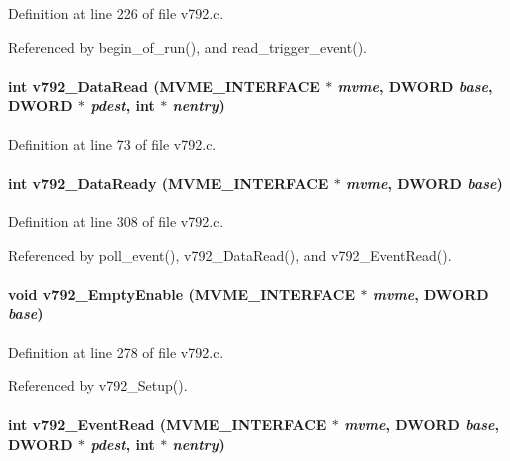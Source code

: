 Definition at line 226 of file v792.c.

Referenced by begin\_\-of\_\-run(), and read\_\-trigger\_\-event().
\paragraph[{v792\_\-DataRead}]{\setlength{\rightskip}{0pt plus 5cm}int v792\_\-DataRead ({\bf MVME\_\-INTERFACE} $\ast$ {\em mvme}, \/  {\bf DWORD} {\em base}, \/  {\bf DWORD} $\ast$ {\em pdest}, \/  int $\ast$ {\em nentry})}\hfill\label{v792_8c_a885c3ecd779966cb3c94376eaafc1e63}


Definition at line 73 of file v792.c.
\paragraph[{v792\_\-DataReady}]{\setlength{\rightskip}{0pt plus 5cm}int v792\_\-DataReady ({\bf MVME\_\-INTERFACE} $\ast$ {\em mvme}, \/  {\bf DWORD} {\em base})}\hfill\label{v792_8c_a9103a1615a623d5e79c0353045abaafa}


Definition at line 308 of file v792.c.

Referenced by poll\_\-event(), v792\_\-DataRead(), and v792\_\-EventRead().
\paragraph[{v792\_\-EmptyEnable}]{\setlength{\rightskip}{0pt plus 5cm}void v792\_\-EmptyEnable ({\bf MVME\_\-INTERFACE} $\ast$ {\em mvme}, \/  {\bf DWORD} {\em base})}\hfill\label{v792_8c_ab61c57bd4759a155b2a6735b955daa5d}


Definition at line 278 of file v792.c.

Referenced by v792\_\-Setup().
\paragraph[{v792\_\-EventRead}]{\setlength{\rightskip}{0pt plus 5cm}int v792\_\-EventRead ({\bf MVME\_\-INTERFACE} $\ast$ {\em mvme}, \/  {\bf DWORD} {\em base}, \/  {\bf DWORD} $\ast$ {\em pdest}, \/  int $\ast$ {\em nentry})}\hfill\label{v792_8c_a723985757a28f135d0b1224a85accb62}


